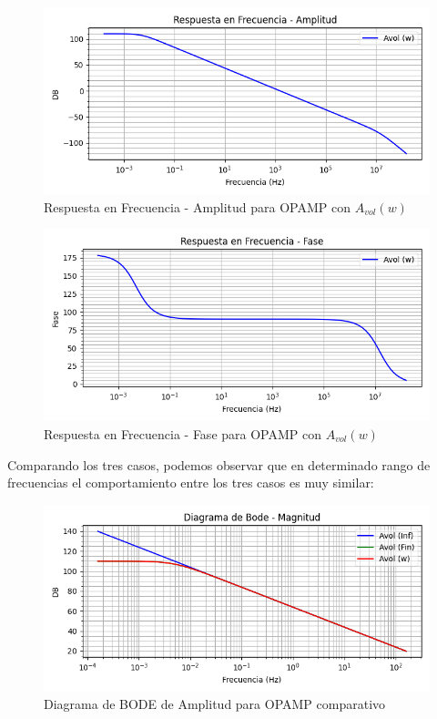 \begin{figure}[H]
    \centering 
    \includegraphics [scale=1] {../Ejercicio3-CircuitoIntegradoresyDerivadores/Imagenes/teorico-avol-w-integrador-amplitud.png} 
    \caption{Respuesta en Frecuencia - Amplitud para OPAMP con $A_{vol}(w)$}
    \label{fig:emptyPlotTool}
\end{figure}

\begin{figure}[H]
    \centering 
    \includegraphics [scale=1] {../Ejercicio3-CircuitoIntegradoresyDerivadores/Imagenes/teorico-avol-w-integrador-fase.png} 
    \caption{Respuesta en Frecuencia - Fase para OPAMP con $A_{vol}(w)$ }
    \label{fig:emptyPlotTool}
\end{figure}

Comparando los tres casos, podemos observar que en determinado rango de frecuencias el comportamiento entre los tres casos es muy similar:


\begin{figure}[H]
    \centering 
    \includegraphics [scale=1] {../Ejercicio3-CircuitoIntegradoresyDerivadores/Imagenes/comparativo-magnitud.png} 
    \caption{Diagrama de BODE de Amplitud para OPAMP comparativo }
    \label{fig:emptyPlotTool}
\end{figure}

